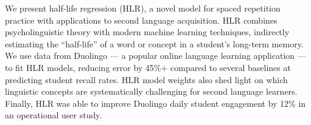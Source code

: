 We present half-life regression (HLR), a novel model for spaced repetition practice with applications to second language acquisition. HLR combines psycholinguistic theory with modern machine learning techniques, indirectly estimating the ``half-life'' of a word or concept in a student's long-term memory. We use data from Duolingo — a popular online language learning application — to fit HLR models, reducing error by 45\%+ compared to several baselines at predicting student recall rates. HLR model weights also shed light on which linguistic concepts are systematically challenging for second language learners. Finally, HLR was able to improve Duolingo daily student engagement by 12\% in an operational user study.
